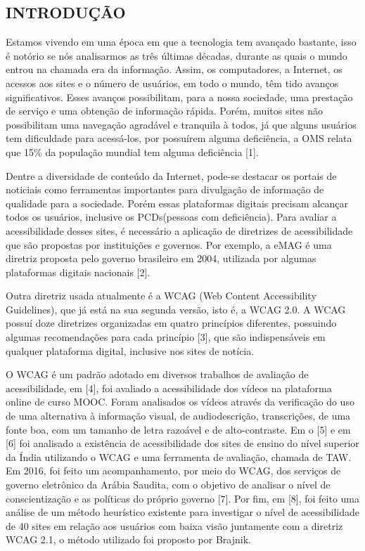 \documentclass[a4paper]{article}
\begin{document}
\begin{titlepage}
	\begin{center}
		\tableofcontents
	\end{center}
\end{titlepage}
\begin{titlepage}
\section{INTRODUÇÃO}
\fontsize{12pt}{0pt}\selectfont
\onehalfspacing
Estamos vivendo em uma época em que a tecnologia tem avançado bastante, isso é notório se nós analisarmos as três últimas décadas, durante as quais o mundo entrou na chamada era da informação. Assim, os computadores, a Internet, os acessos aos sites e o número de usuários, em todo o mundo, têm tido avanços significativos. Esses avanços possibilitam, para a nossa sociedade, uma prestação de serviço e uma obtenção de informação rápida. Porém, muitos sites não possibilitam uma navegação agradável e tranquila à todos, já que alguns usuários tem dificuldade para acessá-los, por possuírem alguma deficiência, a OMS relata que 15\% da população mundial tem alguma deficiência [1].

Dentre a diversidade de conteúdo da Internet, pode-se destacar os portais de noticiais como ferramentas importantes para divulgação de informação de qualidade para a sociedade. Porém essas plataformas digitais precisam alcançar todos os usuários, inclusive os PCDs(pessoas com deficiência). Para avaliar a acessibilidade desses sites, é necessário a aplicação de diretrizes de acessibilidade que são propostas por instituições e governos. Por exemplo, a eMAG é uma diretriz proposta pelo governo brasileiro em 2004, utilizada por algumas plataformas digitais nacionais [2].

Outra diretriz usada atualmente é a WCAG (Web Content Accessibility Guidelines), que já está na sua segunda versão, isto é, a WCAG 2.0. A WCAG possuí doze diretrizes organizadas em quatro princípios diferentes, possuindo algumas recomendações para cada princípio [3], que são indispensáveis em qualquer plataforma digital, inclusive nos sites de notícia.

O WCAG é um padrão adotado em diversos trabalhos de avaliação de acessibilidade, em [4], foi avaliado a acessibilidade dos vídeos na plataforma online de curso MOOC. Foram analisados os vídeos através da verificação do uso de uma alternativa à informação visual, de audiodescrição, transcrições, de uma fonte boa, com um tamanho de letra razoável e de alto-contraste. Em o [5] e em [6] foi analisado a existência de acessibilidade dos sites de ensino do nível superior da Índia utilizando o WCAG e uma ferramenta de avaliação, chamada de TAW. Em 2016, foi feito um acompanhamento, por meio do WCAG, dos serviços de governo eletrônico da Arábia Saudita, com o objetivo de analisar o nível de conscientização e as políticas do próprio governo [7]. Por fim, em [8], foi feito uma análise de um método heurístico existente para investigar o nível de acessibilidade de 40 sites em relação aos usuários com baixa visão juntamente com a diretriz WCAG 2.1, o método utilizado foi proposto por Brajnik.


\end{titlepage}
\end{document}
